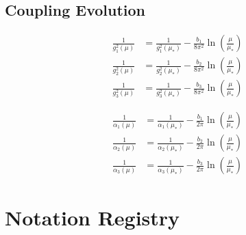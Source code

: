 \documentclass[11pt,a4paper]{article}
\theoremstyle{definition}
\begin{document}
\subsection{Coupling Evolution}
\label{subsec:coupling_evolution}

\begin{align}
\label{eq:g1_evol}
\frac{1}{g_1^2(\mu)} &= \frac{1}{g_1^2(\mu_*)} - \frac{b_1}{8\pi^2}\ln\left(\frac{\mu}{\mu_*}\right) \\
\label{eq:g2_evol}
\frac{1}{g_2^2(\mu)} &= \frac{1}{g_2^2(\mu_*)} - \frac{b_2}{8\pi^2}\ln\left(\frac{\mu}{\mu_*}\right) \\
\label{eq:g3_evol}
\frac{1}{g_3^2(\mu)} &= \frac{1}{g_3^2(\mu_*)} - \frac{b_3}{8\pi^2}\ln\left(\frac{\mu}{\mu_*}\right)
\end{align}

\begin{align}
\label{eq:alpha1_evol}
\frac{1}{\alpha_1(\mu)} &= \frac{1}{\alpha_1(\mu_*)} - \frac{b_1}{2\pi}\ln\left(\frac{\mu}{\mu_*}\right) \\
\label{eq:alpha2_evol}
\frac{1}{\alpha_2(\mu)} &= \frac{1}{\alpha_2(\mu_*)} - \frac{b_2}{2\pi}\ln\left(\frac{\mu}{\mu_*}\right) \\
\label{eq:alpha3_evol}
\frac{1}{\alpha_3(\mu)} &= \frac{1}{\alpha_3(\mu_*)} - \frac{b_3}{2\pi}\ln\left(\frac{\mu}{\mu_*}\right)
\end{align}

\section{Notation Registry}
\label{app:notation}
\end{document}
